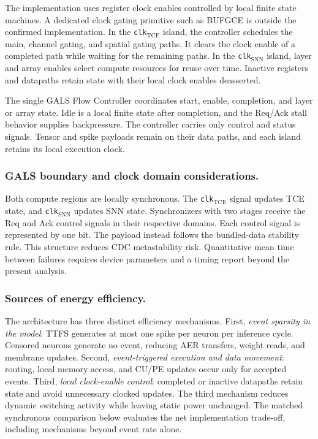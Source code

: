 \documentclass[12pt]{article}
\providecommand{\DIFaddtex}[1]{{\protect\color{blue}\sf #1}}
\providecommand{\DIFadd}[1]{\texorpdfstring{\DIFaddtex{#1}}{#1}}
\providecommand{\DIFaddbegin}{}
\providecommand{\DIFaddend}{}
\begin{document}
 \DIFaddbegin \DIFadd{The implementation uses register clock enables controlled by local finite state machines. A dedicated clock gating primitive such as BUFGCE is outside the confirmed implementation}\DIFaddend . In the  \DIFaddbegin \DIFadd{\texttt{clk}$_{\mathrm{TCE}}$ island, the controller schedules the main, channel gating, and spatial gating paths. It clears the clock enable of a completed path while waiting for the remaining paths. In the \texttt{clk}$_{\mathrm{SNN}}$ island, layer and array enables select compute resources for reuse over time. Inactive registers and datapaths retain state with their local clock enables deasserted.
}

\DIFadd{The single GALS Flow Controller coordinates start, enable, completion, and layer or array state. Idle is a local finite state after completion, and the Req/Ack stall behavior supplies backpressure. The controller carries only control and status signals. Tensor and spike payloads remain on their data paths, and each island retains its local execution clock}\DIFaddend .

 \DIFaddbegin \subsubsection*{\DIFadd{GALS boundary and clock domain considerations.}}
\DIFadd{Both compute regions are locally synchronous. The \texttt{clk}$_{\mathrm{TCE}}$ signal updates TCE state, and \texttt{clk}$_{\mathrm{SNN}}$ updates SNN state. Synchronizers with two stages receive the Req and Ack control signals in their respective domains. Each control signal is represented by one bit. The payload instead follows the bundled-data stability rule. This structure reduces CDC metastability risk. Quantitative mean time between failures requires device parameters and a timing report beyond the present analysis.
}\DIFaddend 

\DIFaddbegin \subsubsection*{\DIFadd{Sources of energy efficiency.}}
\DIFadd{The architecture has three distinct efficiency mechanisms. First, \emph{event sparsity in the model}: TTFS generates at most one spike per neuron per inference cycle. Censored neurons generate no event, reducing AER transfers, weight reads, and membrane updates. Second, \emph{event-triggered execution and data movement}: routing, local memory access, and CU/PE updates occur only for accepted events. Third, \emph{local clock-enable control}: completed or inactive datapaths retain state and avoid unnecessary clocked updates. The third mechanism reduces dynamic switching activity while leaving static power unchanged. The matched synchronous comparison below evaluates the net implementation trade-off, including mechanisms beyond event rate alone.
}
\end{document}
